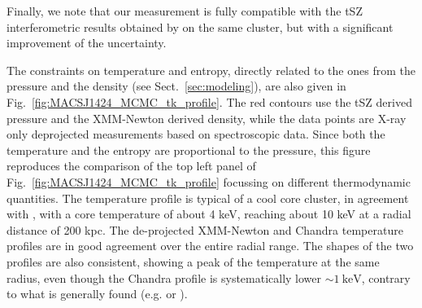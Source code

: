 \documentclass[twocolumn,traditabstract]{aa}
\begin{document}
Finally, we note that our measurement is fully compatible with the tSZ interferometric results obtained by \cite{bonamente2012} on the same cluster, but with a significant improvement of the uncertainty.

The constraints on temperature and entropy, directly related to the ones from the pressure and the density (see Sect.~\ref{sec:modeling}), are also given in Fig.~\ref{fig:MACSJ1424_MCMC_tk_profile}. The red contours use the tSZ derived pressure and the XMM-Newton derived density, while the data points are X-ray only deprojected measurements based on spectroscopic data. Since both the temperature and the entropy are proportional to the pressure, this figure reproduces the comparison of the top left panel of Fig.~\ref{fig:MACSJ1424_MCMC_tk_profile} focussing on different thermodynamic quantities. The temperature profile is typical of a cool core cluster, in agreement with \cite{morandi2010}, with a core temperature of about 4 keV, reaching about 10 keV at a radial distance of 200 kpc. The de-projected XMM-Newton and Chandra temperature profiles are in good agreement over the entire radial range. The shapes of the two profiles are also consistent, showing a peak of the temperature at the same radius, even though the Chandra profile is systematically lower $\sim \SI{1}{\kilo\electronvolt}$, contrary to what is generally found (e.g. \citealt{mahdavi2013} or \citealt{martino2014}).
\end{document}
